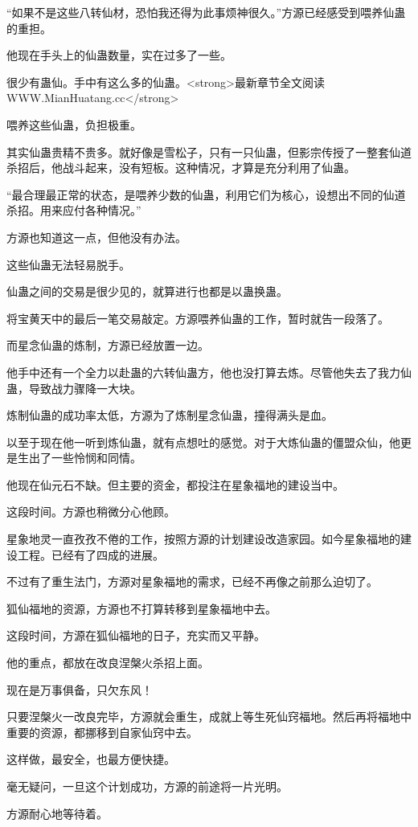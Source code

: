 \begin{this_body}
“如果不是这些八转仙材，恐怕我还得为此事烦神很久。”方源已经感受到喂养仙蛊的重担。

他现在手头上的仙蛊数量，实在过多了一些。

很少有蛊仙。手中有这么多的仙蛊。<strong>最新章节全文阅读WWW.MianHuatang.cc</strong>

喂养这些仙蛊，负担极重。

其实仙蛊贵精不贵多。就好像是雪松子，只有一只仙蛊，但影宗传授了一整套仙道杀招后，他战斗起来，没有短板。这种情况，才算是充分利用了仙蛊。

“最合理最正常的状态，是喂养少数的仙蛊，利用它们为核心，设想出不同的仙道杀招。用来应付各种情况。”

方源也知道这一点，但他没有办法。

这些仙蛊无法轻易脱手。

仙蛊之间的交易是很少见的，就算进行也都是以蛊换蛊。

将宝黄天中的最后一笔交易敲定。方源喂养仙蛊的工作，暂时就告一段落了。

而星念仙蛊的炼制，方源已经放置一边。

他手中还有一个全力以赴蛊的六转仙蛊方，他也没打算去炼。尽管他失去了我力仙蛊，导致战力骤降一大块。

炼制仙蛊的成功率太低，方源为了炼制星念仙蛊，撞得满头是血。

以至于现在他一听到炼仙蛊，就有点想吐的感觉。对于大炼仙蛊的僵盟众仙，他更是生出了一些怜悯和同情。

他现在仙元石不缺。但主要的资金，都投注在星象福地的建设当中。

这段时间。方源也稍微分心他顾。

星象地灵一直孜孜不倦的工作，按照方源的计划建设改造家园。如今星象福地的建设工程。已经有了四成的进展。

不过有了重生法门，方源对星象福地的需求，已经不再像之前那么迫切了。

狐仙福地的资源，方源也不打算转移到星象福地中去。

这段时间，方源在狐仙福地的日子，充实而又平静。

他的重点，都放在改良涅槃火杀招上面。

现在是万事俱备，只欠东风！

只要涅槃火一改良完毕，方源就会重生，成就上等生死仙窍福地。然后再将福地中重要的资源，都挪移到自家仙窍中去。

这样做，最安全，也最方便快捷。

毫无疑问，一旦这个计划成功，方源的前途将一片光明。

方源耐心地等待着。


\end{this_body}
